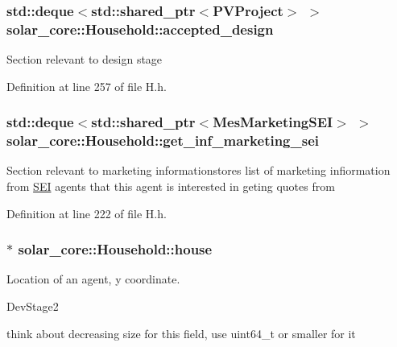 \subsubsection[{accepted\+\_\+design}]{\setlength{\rightskip}{0pt plus 5cm}std\+::deque$<$std\+::shared\+\_\+ptr$<${\bf P\+V\+Project}$>$ $>$ solar\+\_\+core\+::\+Household\+::accepted\+\_\+design\hspace{0.3cm}{\ttfamily [protected]}}\label{classsolar__core_1_1_household_ad4409e81251bdd33d9dca1cd1225dc75}
Section relevant to design stage 

Definition at line 257 of file H.\+h.

\hypertarget{classsolar__core_1_1_household_a3ae4cec5fca43ee5ca3287a01f5a05a2}{}
\subsubsection[{get\+\_\+inf\+\_\+marketing\+\_\+sei}]{\setlength{\rightskip}{0pt plus 5cm}std\+::deque$<$std\+::shared\+\_\+ptr$<${\bf Mes\+Marketing\+S\+E\+I}$>$ $>$ solar\+\_\+core\+::\+Household\+::get\+\_\+inf\+\_\+marketing\+\_\+sei\hspace{0.3cm}{\ttfamily [protected]}}\label{classsolar__core_1_1_household_a3ae4cec5fca43ee5ca3287a01f5a05a2}
Section relevant to marketing informationstores list of marketing infiormation from \hyperlink{classsolar__core_1_1_s_e_i}{S\+E\+I} agents that this agent is interested in geting quotes from 

Definition at line 222 of file H.\+h.

\hypertarget{classsolar__core_1_1_household_a1104d8264fe733937e1fd2e9ad0f8fc1}{}
\subsubsection[{house}]{$\ast$ solar\+\_\+core\+::\+Household\+::house}\label{classsolar__core_1_1_household_a1104d8264fe733937e1fd2e9ad0f8fc1}
Location of an agent, y coordinate.\begin{DoxyRefDesc}{Dev\+Stage2}
\item[\hyperlink{_dev_stage2__DevStage2000007}{Dev\+Stage2}]think about decreasing size for this field, use uint64\+\_\+t or smaller for it \end{DoxyRefDesc}


